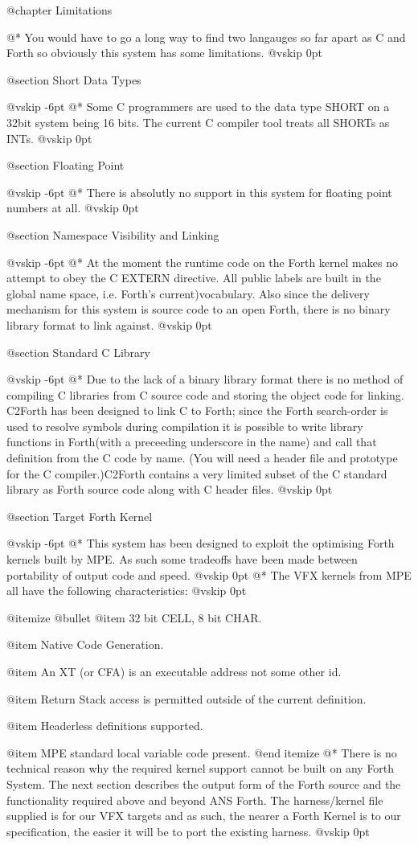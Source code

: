 
@chapter Limitations

@*
You would have to go a long way to find two langauges so far apart
as C and Forth so obviously this system has some limitations.
@vskip 0pt

@section Short Data Types


@vskip -6pt
@*
Some C programmers are used to the data type SHORT on a 32bit
system being 16 bits. The current C compiler tool treats all SHORTs
as INTs.
@vskip 0pt

@section Floating Point


@vskip -6pt
@*
There is absolutly no support in this system for floating point
numbers at all.
@vskip 0pt

@section Namespace Visibility and Linking


@vskip -6pt
@*
At the moment the runtime code on the Forth kernel makes no
attempt to obey the C EXTERN directive. All public labels are
built in the global name space, i.e. Forth's current)vocabulary.
Also since the delivery mechanism for this system is source
code to an open Forth, there is no binary library format to
link against.
@vskip 0pt

@section Standard C Library


@vskip -6pt
@*
Due to the lack of a binary library format there is no
method of compiling C libraries from C source code and
storing the object code for linking. C2Forth has been
designed to link C to Forth; since the Forth search-order
is used to resolve symbols during compilation it is possible
to write library functions in Forth(with a preceeding
underscore in the name) and call that definition from the C
code by name. (You will need a header file and prototype for
the C compiler.)C2Forth contains a very limited subset of
the C standard library as Forth source code along with C
header files.
@vskip 0pt

@section Target Forth Kernel


@vskip -6pt
@*
This system has been designed to exploit the optimising Forth
kernels built by MPE. As such some tradeoffs have been made
between portability of output code and speed.
@vskip 0pt
@*
The VFX kernels from MPE all have the following characteristics:
@vskip 0pt

@itemize @bullet 
@item 32 bit CELL, 8 bit CHAR.

@item Native Code Generation.

@item An XT (or CFA) is an executable address not some other id.

@item Return Stack access is permitted outside of the current definition.

@item Headerless definitions supported.

@item MPE standard local variable code present.
@end itemize
@*
There is no technical reason why the required kernel support
cannot be built on any Forth System. The next section describes
the output form of the Forth source and the functionality
required above and beyond ANS Forth. The harness/kernel file
supplied is for our VFX targets and as such, the nearer a
Forth Kernel is to our specification, the easier it will be
to port the existing harness.
@vskip 0pt
